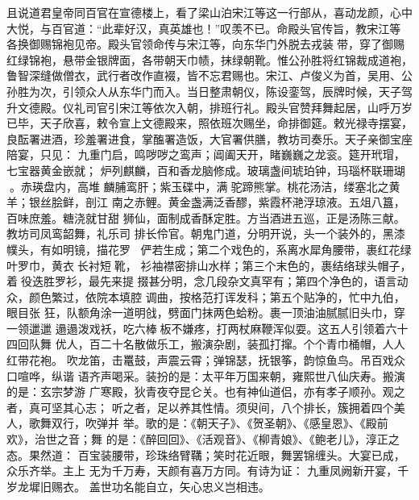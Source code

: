 且说道君皇帝同百官在宣德楼上，看了梁山泊宋江等这一行部从，喜动龙颜，心中
大悦，与百官道：“此辈好汉，真英雄也！”叹羡不已。命殿头官传旨，教宋江等
各换御赐锦袍见帝。殿头官领命传与宋江等，向东华门外脱去戎装带，穿了御赐
红绿锦袍，悬带金银牌面，各带朝天巾帻，抹绿朝靴。惟公孙胜将红锦裁成道袍，
鲁智深缝做僧衣，武行者改作直裰，皆不忘君赐也。宋江、卢俊义为首，吴用、公
孙胜为次，引领众人从东华门而入。当日整肃朝仪，陈设銮驾，辰牌时候，天子驾
升文德殿。仪礼司官引宋江等依次入朝，排班行礼。殿头官赞拜舞起居，山呼万岁
已毕，天子欣喜，敕令宣上文德殿来，照依班次赐坐，命排御筵。敕光禄寺摆宴，
良酝署进酒，珍羞署进食，掌醢署造饭，大官署供膳，教坊司奏乐。天子亲御宝座
陪宴，只见：
九重门启，鸣哕哕之鸾声；阊阖天开，睹巍巍之龙衮。筵开玳瑁，七宝器黄金嵌就；
炉列麒麟，百和香龙脑修成。玻璃盏间琥珀钟，玛瑙杯联珊瑚。赤瑛盘内，高堆
麟脯鸾肝；紫玉碟中，满驼蹄熊掌。桃花汤洁，缕塞北之黄羊；银丝脍鲜，剖江
南之赤鲤。黄金盏满泛香醪，紫霞杯滟浮琼液。五俎八簋，百味庶羞。糖浇就甘甜
狮仙，面制成香酥定胜。方当酒进五巡，正是汤陈三献。教坊司凤鸾韶舞，礼乐司
排长伶官。朝鬼门道，分明开说，头一个装外的，黑漆幞头，有如明镜，描花罗，
俨若生成；第二个戏色的，系离水犀角腰带，裹红花绿叶罗巾，黄衣长衬短靴，
衫袖襟密排山水样；第三个末色的，裹结络球头帽子，着役迭胜罗衫，最先来提
掇甚分明，念几段杂文真罕有；第四个净色的，语言动众，颜色繁过，依院本填腔
调曲，按格范打诨发科；第五个贴净的，忙中九伯，眼目张
狂，队额角涂一道明戗，劈面门抹两色蛤粉。裹一顶油油腻腻旧头巾，穿一领邋邋
遢遢泼戏袄，吃六棒板不嫌疼，打两杖麻鞭浑似耍。这五人引领着六十四回队舞
优人，百二十名散做乐工，搬演杂剧，装孤打撺。个个青巾桶帽，人人红带花袍。
吹龙笛，击鼍鼓，声震云霄；弹锦瑟，抚银筝，韵惊鱼鸟。吊百戏众口喧哗，纵谐
语齐声喝采。装扮的是：太平年万国来朝，雍熙世八仙庆寿。搬演的是：玄宗梦游
广寒殿，狄青夜夺昆仑关。也有神仙道侣，亦有孝子顺孙。观之者，真可坚其心志；
听之者，足以养其性情。须臾间，八个排长，簇拥着四个美人，歌舞双行，吹弹并
举。歌的是：《朝天子》、《贺圣朝》、《感皇恩》、《殿前欢》，治世之音；舞
的是：《醉回回》、《活观音》、《柳青娘》、《鲍老儿》，淳正之态。果然道：
百宝装腰带，珍珠络臂鞲；笑时花近眼，舞罢锦缠头。大宴已成，众乐齐举。主上
无为千万寿，天颜有喜万方同。有诗为证：
九重凤阙新开宴，千岁龙墀旧赐衣。
盖世功名能自立，矢心忠义岂相违。

